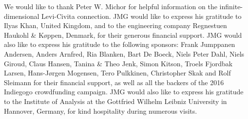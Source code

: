 \documentclass[letterpaper,11pt]{article}
\begin{document}
\noindent
We would like to thank Peter W. Michor for helpful information on the infinite-dimensional Levi-Civita connection.
JMG would like to express his gratitude to Ilyas Khan, United Kingdom, and to the engineering company Regnestuen Haukohl \& K\o ppen, Denmark, for their generous financial support. JMG would also like to express his gratitude to the following sponsors:  Frank Jumppanen Andersen, Anders Arnfred, Ria Blanken, Bart De Boeck, Niels Peter Dahl, Niels Giroud, Claus Hansen, Tanina \& Theo Jenk, Simon Kitson, Troels Fjordbak Larsen, Hans-J\o rgen Mogensen, Tero Pulkkinen, Christopher Skak and  Rolf Sleimann for their financial support, as well as all the backers of the 2016 Indiegogo crowdfunding campaign. JMG would also like to express his gratitude to the Institute of Analysis at the Gottfried Wilhelm Leibniz University in Hannover, Germany, for kind hospitality during numerous visits.
\end{document}
